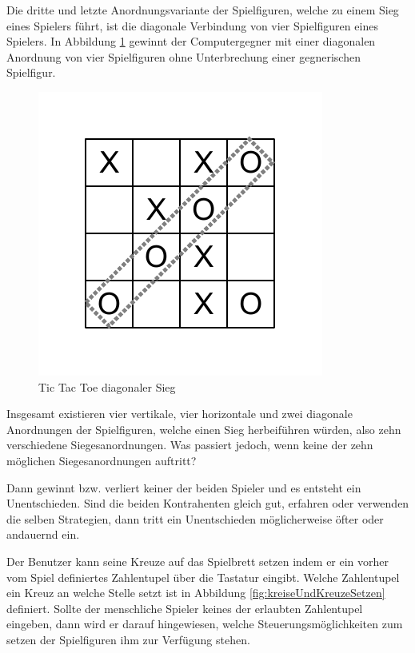 Die dritte und letzte Anordnungsvariante der Spielfiguren, welche zu einem Sieg eines Spielers führt, ist die diagonale Verbindung von vier Spielfiguren eines Spielers. In Abbildung \ref{fig:tttDiagonalerSieg} gewinnt der Computergegner mit einer diagonalen Anordnung von vier Spielfiguren ohne Unterbrechung einer gegnerischen Spielfigur.

\begin{figure}[!htbp]
  \centering
  \includegraphics[scale = 1]{inhalt/abbildungen/diagonaler_sieg.pdf}
  \caption{Tic Tac Toe diagonaler Sieg}
  \label{fig:tttDiagonalerSieg}
\end{figure}

Insgesamt existieren vier vertikale, vier horizontale und zwei diagonale Anordnungen der Spielfiguren, welche einen Sieg herbeiführen würden, also zehn verschiedene Siegesanordnungen. Was passiert jedoch, wenn keine der zehn möglichen Siegesanordnungen auftritt?

Dann gewinnt bzw. verliert keiner der beiden Spieler und es entsteht ein Unentschieden. Sind die beiden Kontrahenten gleich gut, erfahren oder verwenden die selben Strategien, dann tritt ein Unentschieden möglicherweise öfter oder andauernd ein.


Der Benutzer kann seine Kreuze auf das Spielbrett setzen indem er ein vorher vom Spiel definiertes Zahlentupel über die Tastatur eingibt. Welche Zahlentupel ein Kreuz an welche Stelle setzt ist in Abbildung \ref{fig:kreiseUndKreuzeSetzen} definiert. Sollte der menschliche Spieler keines der erlaubten Zahlentupel eingeben, dann wird er darauf hingewiesen, welche Steuerungsmöglichkeiten zum setzen der Spielfiguren ihm zur Verfügung stehen.

